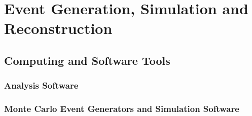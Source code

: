 \chapter{Event Generation, Simulation and Reconstruction}
\label{chap:Reconstruction}
\section{Computing and Software Tools}

\subsection{Analysis Software}

\subsection{Monte Carlo Event Generators and Simulation Software}

